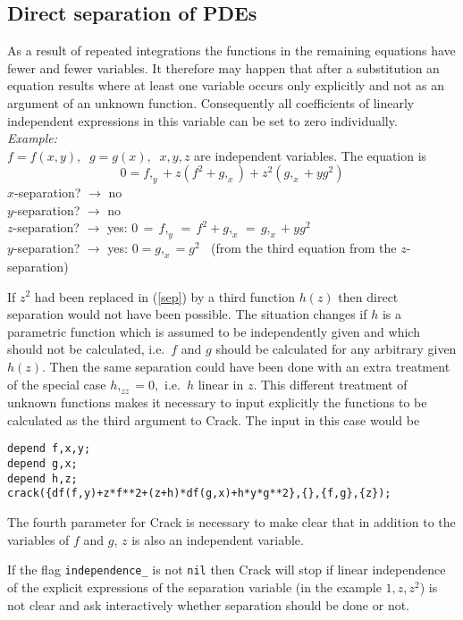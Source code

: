 \documentclass[12pt]{article}
\begin{document}
\subsection{Direct separation of PDEs}
As a result of repeated integrations the functions in the
remaining equations have fewer and fewer variables. It therefore may happen
that after a substitution an equation results where at least one variable
occurs only explicitly and not as an argument of an unknown function.
Consequently all coefficients of linearly independent expressions in this
variable can be set to zero individually. \\
{\em Example:}  \\
$f = f(x,y), \;\; g = g(x), \;\; x,y,z$ are independent variables.
The equation is
\begin{equation}
0 = f,_y + z(f^2+g,_x) + z^2(g,_x+yg^2) \label{sep}
\end{equation}
$x$-separation? $\rightarrow$ no  \\
$y$-separation? $\rightarrow$ no  \\
$z$-separation? $\rightarrow$ yes: $0 \,=\, f,_y \,=\, f^2+g,_x \,=\,
g,_x+yg^2$ \\
$y$-separation? $\rightarrow$ yes: $0 = g,_x = g^2\;\;$
(from the third equation from the $z$-separation)

If $z^2$ had been replaced in (\ref{sep}) by a third
function $h(z)$ then direct separation would not have been possible.
The situation changes if $h$ is a parametric function which is
assumed to be independently given and which should not be
calculated, i.e.\ $f$ and $g$ should be calculated for any
arbitrary given $h(z)$. Then the same separation could have been
done with an extra treatment of the special case $h,_{zz} = 0,$
i.e.\ $h$ linear in $z$. This different treatment of unknown functions
makes it necessary to input explicitly the functions to be
calculated as the third argument to {\sc Crack}. The input
in this case would be
\begin{verbatim}
depend f,x,y;
depend g,x;
depend h,z;
crack({df(f,y)+z*f**2+(z+h)*df(g,x)+h*y*g**2},{},{f,g},{z});
\end{verbatim}
The fourth parameter for {\sc Crack} is necessary to make clear that
in addition to the variables of $f$ and $g$, $z$ is also an independent
variable.

If the flag {\tt independence\_} is not {\tt nil} then {\sc Crack} will
stop if linear independence of the explicit expressions of the
separation variable (in the example $1,z,z^2$) is not clear and ask
interactively whether separation should be done or not.
\end{document}
